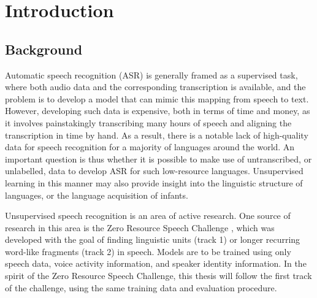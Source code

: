 %
%
%

\chapter{Introduction}
\section{Background}
Automatic speech recognition (ASR) is generally framed as a supervised task, where both audio data and the corresponding transcription is available, and the problem is to develop a model that can mimic this mapping from speech to text.
However, developing such data is expensive, both in terms of time and money, as it involves painstakingly transcribing many hours of speech and aligning the transcription in time by hand.
As a result, there is a notable lack of high-quality data for speech recognition for a majority of languages around the world.
An important question is thus whether it is possible to make use of untranscribed, or unlabelled, data to develop ASR for such low-resource languages.
Unsupervised learning in this manner may also provide insight into the linguistic structure of languages, or the language acquisition of infants.

Unsupervised speech recognition is an area of active research.
One source of research in this area is the Zero Resource Speech Challenge \parencite{versteegh2015zero}, which was developed with the goal of finding linguistic units (track 1) or longer recurring word-like fragments (track 2) in speech.
Models are to be trained using only speech data, voice activity information, and speaker identity information.
In the spirit of the Zero Resource Speech Challenge, this thesis will follow the first track of the challenge, using the same training data and evaluation procedure.

